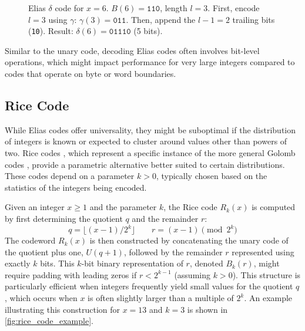 \begin{figure}[hbtp]
    \centering
    \caption{Elias $\delta$ code for $x=6$. $B(6)=\texttt{110}$, length $l=3$. First, encode $l=3$ using $\gamma$: $\gamma(3)=\texttt{011}$. Then, append the $l-1=2$ trailing bits (\texttt{10}). Result: $\delta(6)=\texttt{01110}$ (5 bits).}
    \label{fig:delta_code_example}
\end{figure}

\noindent Similar to the unary code, decoding Elias codes often involves bit-level operations, which might impact performance for very large integers compared to codes that operate on byte or word boundaries.

\subsection{Rice Code}
While Elias codes offer universality, they might be suboptimal if the distribution of integers is known or expected to cluster around values other than powers of two. Rice codes \cite{rice1979some}, which represent a specific instance of the more general Golomb codes \cite{golomb1966run}, provide a parametric alternative better suited to certain distributions. These codes depend on a parameter $k > 0$, typically chosen based on the statistics of the integers being encoded.

Given an integer $x \ge 1$ and the parameter $k$, the Rice code $R_k(x)$ is computed by first determining the quotient $q$ and the remainder $r$:
\[ q = \lfloor (x-1) / 2^k \rfloor \qquad r = (x-1) \pmod{2^k} \]
The codeword $R_k(x)$ is then constructed by concatenating the unary code of the quotient plus one, $U(q+1)$, followed by the remainder $r$ represented using exactly $k$ bits. This $k$-bit binary representation of $r$, denoted $B_k(r)$, might require padding with leading zeros if $r < 2^{k-1}$ (assuming $k>0$). This structure is particularly efficient when integers frequently yield small values for the quotient $q$, which occurs when $x$ is often slightly larger than a multiple of $2^k$. An example illustrating this construction for $x=13$ and $k=3$ is shown in \autoref{fig:rice_code_example}.

